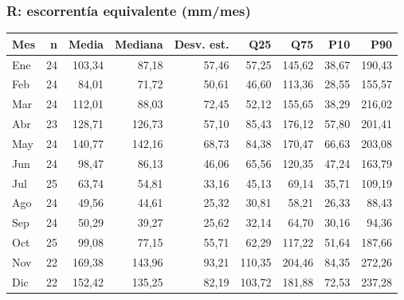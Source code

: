 \documentclass[10pt,a4paper]{article}
\begin{document}
\subsubsection*{R: escorrentía equivalente (mm/mes)}
\begin{center}\small\begin{tabular}{lrrrrrrrr}\hline
Mes & n & Media & Mediana & Desv. est. & Q25 & Q75 & P10 & P90 \\\hline
Ene & 24 & 103,34 & 87,18 & 57,46 & 57,25 & 145,62 & 38,67 & 190,43\\
Feb & 24 & 84,01 & 71,72 & 50,61 & 46,60 & 113,36 & 28,55 & 155,57\\
Mar & 24 & 112,01 & 88,03 & 72,45 & 52,12 & 155,65 & 38,29 & 216,02\\
Abr & 23 & 128,71 & 126,73 & 57,10 & 85,43 & 176,12 & 57,80 & 201,41\\
May & 24 & 140,77 & 142,16 & 68,73 & 84,38 & 170,47 & 66,63 & 203,08\\
Jun & 24 & 98,47 & 86,13 & 46,06 & 65,56 & 120,35 & 47,24 & 163,79\\
Jul & 25 & 63,74 & 54,81 & 33,16 & 45,13 & 69,14 & 35,71 & 109,19\\
Ago & 24 & 49,56 & 44,61 & 25,32 & 30,81 & 58,21 & 26,33 & 88,43\\
Sep & 24 & 50,29 & 39,27 & 25,62 & 32,14 & 64,70 & 30,16 & 94,36\\
Oct & 25 & 99,08 & 77,15 & 55,71 & 62,29 & 117,22 & 51,64 & 187,66\\
Nov & 22 & 169,38 & 143,96 & 93,21 & 110,35 & 204,46 & 84,35 & 272,26\\
Dic & 22 & 152,42 & 135,25 & 82,19 & 103,72 & 181,88 & 72,53 & 237,28\\
\hline\end{tabular}\end{center}
\end{document}
